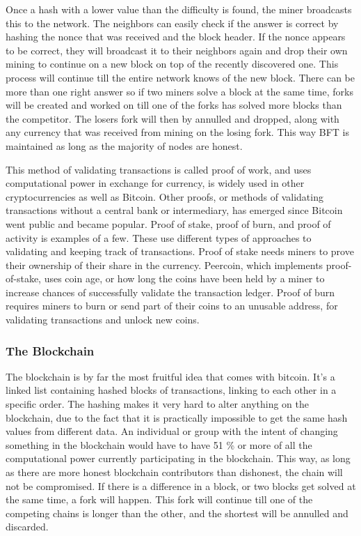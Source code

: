 \documentclass[12pt]{article}
\begin{document}
Once a hash with a lower value than the difficulty is found, the miner broadcasts this to the network. The neighbors can easily check if the answer is correct by hashing the nonce that was received and the block header. If the nonce appears to be correct, they will broadcast it to their neighbors again and drop their own mining to continue on a new block on top of the recently discovered one. This process will continue till the entire network knows of the new block. There can be more than one right answer so if two miners solve a block at the same time, forks will be created and worked on till one of the forks has solved more blocks than the competitor. The losers fork will then by annulled and dropped, along with any currency that was received from mining on the losing fork. This way BFT is maintained as long as the majority of nodes are honest.

This method of validating transactions is called proof of work, and uses computational power in exchange for currency, is widely used in other cryptocurrencies as well as Bitcoin. Other proofs, or methods of validating transactions without a central bank or intermediary, has emerged since Bitcoin went public and became popular. Proof of stake, proof of burn, and proof of activity is examples of a few. These use different  types of approaches to validating and keeping track of transactions. Proof of stake needs miners to prove their ownership of their share in the currency. Peercoin, which implements proof-of-stake, uses coin age, or how long the coins have been held by a miner to increase chances of successfully validate the transaction ledger. Proof of burn requires miners to burn or send part of their coins to an unusable address, for validating transactions and unlock new coins. 

\subsubsection{The Blockchain}

The blockchain is by far the most fruitful idea that comes with bitcoin. It's a linked list containing hashed blocks of transactions, linking to each other in a specific order. The hashing makes it very hard to alter anything on the blockchain, due to the fact that it is practically impossible to get the same hash values from different data. An individual or group with the intent of changing something in the blockchain would have to have 51 \% or more of all the computational power currently participating in the blockchain. This way, as long as there are more honest blockchain contributors than dishonest, the chain will not be compromised. If there is a difference in a block, or two blocks get solved at the same time, a fork will happen. This fork will continue till one of the competing chains is longer than the other, and the shortest will be annulled and discarded. 
\end{document}

